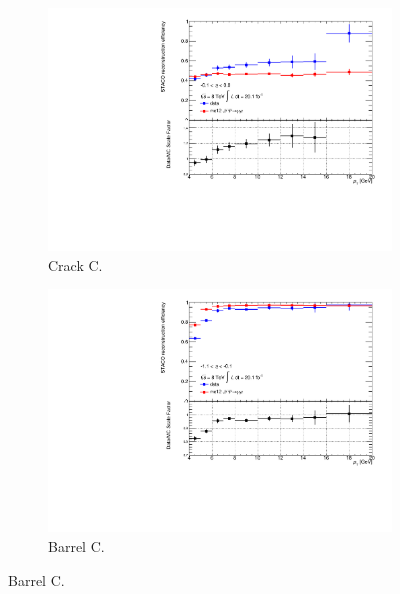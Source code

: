 \begin{figure}[htbp]
  \centering
    \begin{subfigure}[b]{0.45\textwidth}
      \includegraphics[width=\textwidth]{PartCalibration2012/Plots/SFPlots/Crack_C_reco.pdf}
      \caption{Crack C.}\label{fig:CalibrationRecoSFCrackC}
    \end{subfigure}
    \hfill
    \begin{subfigure}[b]{0.45\textwidth}
      \includegraphics[width=\textwidth]{PartCalibration2012/Plots/SFPlots/Barrel_C_reco.pdf}
      \caption{Barrel C.}\label{fig:CalibrationRecoSFBarrelC}
    \end{subfigure}


\end{figure}
